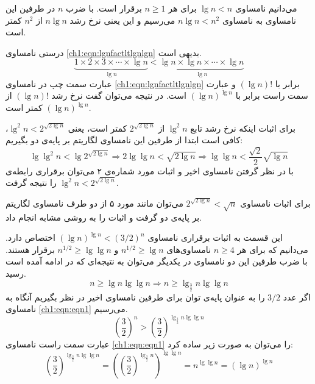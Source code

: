  می‌دانیم نامساوی {$\lg n < n$} برای هر {$n \geqslant 1$} برقرار است. با ضرب {$n$} در طرفین این نامساوی به نامساوی {$n\lg n < n^2$} می‌رسیم و این یعنی نرخ رشد {$n\lg n$} از {$n^2$} کمتر است.

 درستی نامساوی {\eqref{ch1:eqn:lgnfactltlgnlgn}} بدیهی است.
\begin{equation}
\underbrace{1 \times 2 \times 3 \times \cdots \times \lg n}_{\lg n} < \underbrace{\lg n \times  \lg n \times \cdots \times \lg n}_{\lg n}\label{ch1:eqn:lgnfactltlgnlgn}
\end{equation}
عبارت سمت چپ در نامساوی {\eqref{ch1:eqn:lgnfactltlgnlgn}} برابر با {$(\lg n)!$} و عبارت سمت راست برابر با {${(\lg n)}^{\lg n}$} است. در نتیجه می‌توان گفت نرخ رشد {$(\lg n)!$} از {${(\lg n)}^{\lg n}$} کمتر است.

 برای اثبات اینکه نرخ رشد تابع {${\lg}^2 n$}  از {$2^{\sqrt{2\lg n}}$} کمتر است، یعنی {${\lg}^2 n < 2^{\sqrt{2\lg n}}$}، کافی است ابتدا از طرفین این نامساوی لگاریتم بر پایه‌ی دو بگیریم:
\begin{displaymath}
\lg {\lg}^2 n < \lg 2^{\sqrt{2\lg n}} \Rightarrow 2\lg \lg n < \sqrt{2\lg n}\Rightarrow \lg \lg n < \dfrac{\sqrt{2}}{2}\sqrt{\lg n}
\end{displaymath}
با در نظر گرفتن نامساوی اخیر و اثبات مورد شماره‌ی ۲ می‌توان برقراری رابطه‌ی {${\lg}^2 n < 2^{\sqrt{2\lg n}}$} را نتیجه گرفت.

 برای اثبات نامساوی {$2^{\sqrt{2\lg n}}< \sqrt{n}$} می‌توان مانند مورد ۵ از دو طرف نامساوی لگاریتم بر پایه‌ی دو گرفت و اثبات را به روشی مشابه انجام داد.

 این قسمت به اثبات برقراری نامساوی {${(\lg n)}^{\lg n} < {(3/2)}^n$} اختصاص دارد. می‌دانیم که برای هر {$n \geqslant 4$} نامساوی‌های {$n^{1/2} \geqslant \lg n$} و {$n^{1/2} \geqslant \lg \lg n$} برقرار هستند. با ضرب طرفین این دو نامساوی در یکدیگر می‌توان به نتیجه‌ای که در ادامه آمده است رسید.
\begin{displaymath}
n \geq \lg n \lg \lg n \Rightarrow n \geq \lg_{\frac{3}{2}} n\lg \lg n
\end{displaymath}
اگر عدد {$3/2$} را به عنوان پایه‌ی توان برای طرفین نامساوی اخیر در نظر بگیریم آنگاه به نامساوی {\eqref{ch1:eqn:eqn1}} می‌رسیم.
\begin{equation}
{\left( \frac{3}{2}\right)}^n > {\left( \frac{3}{2}\right)}^{\lg_{\frac{3}{2}} n\lg \lg n}\label{ch1:eqn:eqn1}
\end{equation}
عبارت سمت راست نامساوی {\eqref{ch1:eqn:eqn1}} را می‌توان به صورت زیر ساده کرد:
\begin{displaymath}
{\left( \frac{3}{2}\right)}^{\lg_{\frac{3}{2}} n\lg \lg n}={\left({\left( \frac{3}{2}\right)}^{\lg_{\frac{3}{2}} n}\right)}^{\lg \lg n} = n^{\lg \lg n} = {(\lg n)}^{\lg n}
\end{displaymath}

